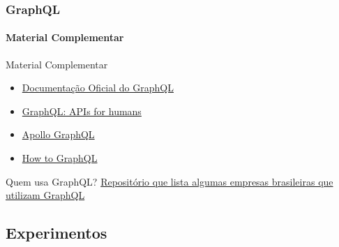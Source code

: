 \documentclass[
	9pt, %
	t, %
]{beamer}
\newcommand{\iconLink}[2]{\href{#1}{\faLink \hspace{0.2em} {#2}}}
\begin{document}
\begin{frame}
	\frametitle{GraphQL}
	\framesubtitle{Material Complementar}

	\begin{block}{Material Complementar}
		\begin{itemize}
			\item \iconLink{https://graphql.org/}{Documentação Oficial do GraphQL}
			\item \iconLink{https://graphql.com/}{GraphQL: APIs for humans}
			\item \iconLink{https://www.apollographql.com/docs/}{Apollo GraphQL}
			\item \iconLink{https://www.howtographql.com/}{How to GraphQL}
		\end{itemize}
	\end{block}

	\begin{block}{Quem usa GraphQL?}
		\iconLink{https://github.com/graphql-brasil/empresas-que-usam-graphql-no-brasil}{Repositório que lista algumas empresas brasileiras que utilizam GraphQL}
	\end{block}

\end{frame}

\subsection{Experimentos}
\end{document}

